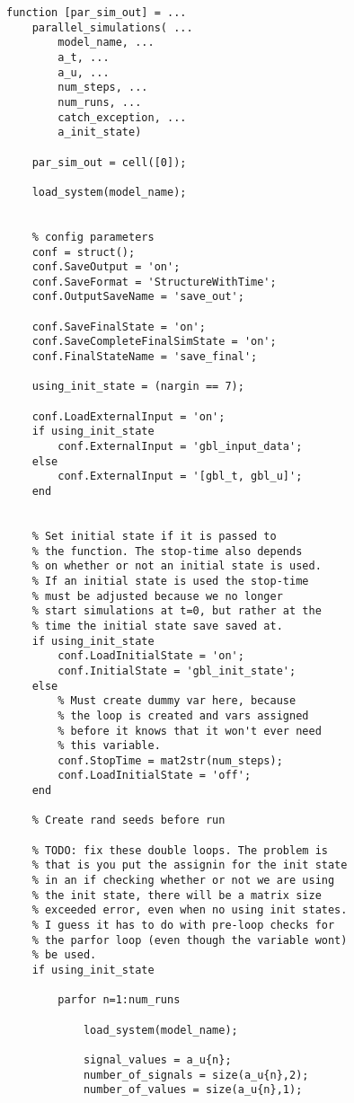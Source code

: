 \begin{lstlisting}
function [par_sim_out] = ...
    parallel_simulations( ...
        model_name, ...
        a_t, ...
        a_u, ...
        num_steps, ...
        num_runs, ...
        catch_exception, ...
        a_init_state)

    par_sim_out = cell([0]);

    load_system(model_name);
   

    % config parameters
    conf = struct();
    conf.SaveOutput = 'on';
    conf.SaveFormat = 'StructureWithTime';
    conf.OutputSaveName = 'save_out';

    conf.SaveFinalState = 'on';
    conf.SaveCompleteFinalSimState = 'on';
    conf.FinalStateName = 'save_final';
    
    using_init_state = (nargin == 7);

    conf.LoadExternalInput = 'on';
    if using_init_state
        conf.ExternalInput = 'gbl_input_data';
    else
        conf.ExternalInput = '[gbl_t, gbl_u]';
    end


    % Set initial state if it is passed to
    % the function. The stop-time also depends
    % on whether or not an initial state is used.
    % If an initial state is used the stop-time
    % must be adjusted because we no longer
    % start simulations at t=0, but rather at the
    % time the initial state save saved at.
    if using_init_state 
        conf.LoadInitialState = 'on';
        conf.InitialState = 'gbl_init_state';
    else
        % Must create dummy var here, because
        % the loop is created and vars assigned
        % before it knows that it won't ever need
        % this variable.
        conf.StopTime = mat2str(num_steps);
        conf.LoadInitialState = 'off';
    end

    % Create rand seeds before run
        
    % TODO: fix these double loops. The problem is
    % that is you put the assignin for the init state
    % in an if checking whether or not we are using
    % the init state, there will be a matrix size
    % exceeded error, even when no using init states.
    % I guess it has to do with pre-loop checks for
    % the parfor loop (even though the variable wont)
    % be used.
    if using_init_state

        parfor n=1:num_runs

            load_system(model_name);

            signal_values = a_u{n};
            number_of_signals = size(a_u{n},2);
            number_of_values = size(a_u{n},1);


\end{lstlisting}

